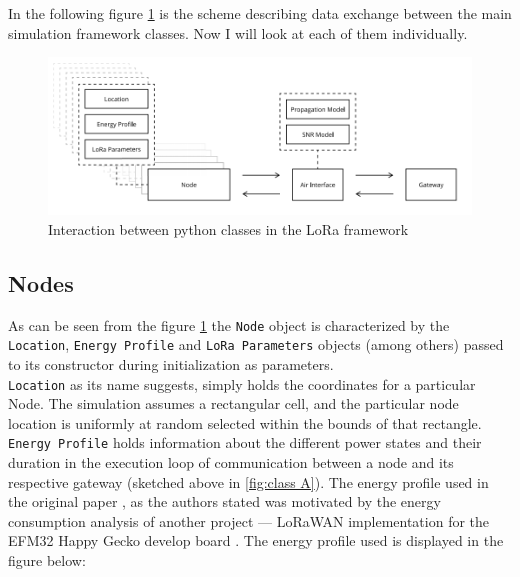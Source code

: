 In the following figure \ref{fig:architecture} is the scheme describing data exchange between the main
simulation framework classes. Now I will look at each of them individually.

\begin{figure}[H]
  \centering
  \includegraphics[scale=0.6]{figures/architecture.PNG}
  \caption{Interaction between python classes in the LoRa framework \cite{simulator}}
  \label{fig:architecture}
\end{figure}

\subsection{Nodes}

As can be seen from the figure \ref{fig:architecture} the \texttt{Node} object is characterized by the \texttt{Location}, \texttt{Energy Profile} and \texttt{LoRa Parameters} objects (among others) passed to its constructor during initialization as parameters.\\

\texttt{Location} as its name suggests, simply holds the coordinates for a particular Node. The simulation assumes a rectangular cell, and the particular node location is uniformly at random selected within the bounds of that rectangle. \\

\texttt{Energy Profile} holds information about the different power states and their duration in the execution loop of communication between a node and its respective gateway (sketched above in \ref{fig:class A}). The energy profile used in the original paper \cite{simulator}, as the authors stated was motivated by the energy consumption analysis of another project — LoRaWAN implementation for the EFM32 Happy Gecko develop board \cite{energy_profile}. The energy profile used is displayed in the figure below:

